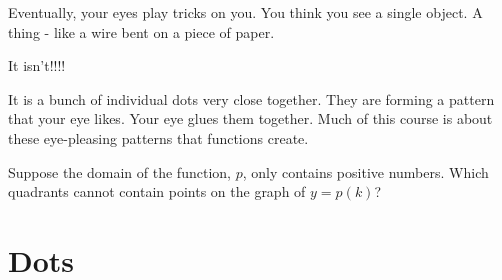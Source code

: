 \documentclass{ximera}
\begin{document}
Eventually, your eyes play tricks on you.  You think you see a single object.  A thing - like a wire bent on a piece of paper.



\begin{image}
\end{image}



\large{It isn't!!!!}




It is a bunch of individual dots very close together. They are forming a pattern that your eye likes. Your eye glues them together.  Much of this course is about these eye-pleasing patterns that functions create.





\begin{question}
Suppose the domain of the function, $p$, only contains positive numbers.  Which quadrants cannot contain points on the graph of $y=p(k)$?

\begin{selectAll}
\end{selectAll}

\end{question}




















\section*{Dots}
\end{document}
